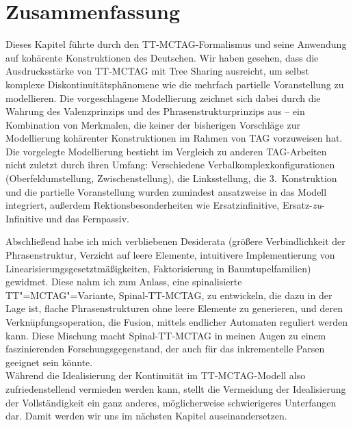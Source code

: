 \section{Zusammenfassung}

Dieses Kapitel führte durch den TT-MCTAG-Formalismus und seine Anwendung auf kohärente Konstruktionen des Deutschen. Wir haben gesehen, dass die Ausdrucksstärke von TT-MCTAG mit Tree Sharing ausreicht, um selbst  komplexe Diskontinuitätsphänomene wie die mehrfach partielle Voranstellung zu modellieren. Die vorgeschlagene Modellierung zeichnet sich dabei durch die Wahrung des Valenzprinzips und des Phrasenstrukturprinzips aus -- ein Kombination von Merkmalen, die keiner der bisherigen Vorschläge zur Modellierung kohärenter Konstruktionen im Rahmen von TAG vorzuweisen hat. Die vorgelegte Modellierung besticht im Vergleich zu anderen TAG-Arbeiten nicht zuletzt durch ihren Umfang: Verschiedene  Verbalkomplexkonfigurationen (Oberfeldumstellung, Zwischenstellung), die Linksstellung, die 3.~Konstruktion und die partielle Voranstellung wurden zumindest ansatzweise in das Modell integriert, au\ss erdem Rektionsbesonderheiten wie Ersatzinfinitive, Ersatz-\emph{zu}-Infinitive und das Fernpassiv.  

Abschlie\ss end habe ich mich verbliebenen Desiderata (grö\ss ere Verbindlichkeit der Phrasenstruktur, Verzicht auf leere Elemente, intuitivere Implementierung von Linearisierungsgesetztmä\ss igkeiten, Faktorisierung in Baumtupelfamilien) gewidmet. Diese nahm ich zum Anlass, eine spinalisierte TT"=MCTAG"=Variante, Spinal-TT-MCTAG, zu entwickeln, die dazu in der Lage ist, flache Phrasenstrukturen ohne leere Elemente zu generieren, und deren Verknüpfungsoperation, die Fusion, mittels endlicher Automaten reguliert werden kann. Diese Mischung macht Spinal-TT-MCTAG in meinen Augen zu einem faszinierenden Forschungsgegenstand, der auch für das inkrementelle Parsen geeignet sein könnte. \\

Während die Idealisierung der Kontinuität im TT-MCTAG-Modell also zufriedenstellend vermieden werden kann, stellt die Vermeidung der Idealisierung der Vollständigkeit ein ganz anderes, möglicherweise schwierigeres Unterfangen dar. Damit werden wir uns im nächsten Kapitel auseinandersetzen.         





